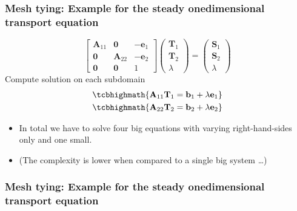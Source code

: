 \documentclass[10pt,xcolor=dvipsnames]{beamer}
\begin{document}
\begin{frame}[t]

 \frametitle{Mesh tying: Example for the steady onedimensional transport equation}
\begin{equation*}
 \begin{bmatrix}
   \mathbf A_{11} & \mathbf0 & -\mathbf e_1\\
   \mathbf0 & \mathbf A_{22} & -\mathbf e_2\\
   \mathbf 0 & \mathbf 0 & 1
  \end{bmatrix}
  \begin{pmatrix}
  \mathbf T_1\\ \mathbf T_2\\ \lambda
  \end{pmatrix} = \begin{pmatrix}\mathbf S_1 \\ \mathbf S_2 \\ \lambda \end{pmatrix}
\end{equation*}
\justifying Compute solution on each subdomain
\begin{equation*}
 \begin{split}
    \tcbhighmath{
    \mathbf A_{11} \mathbf T_1 = \mathbf b_1 + \lambda \mathbf e_1}\\
    \tcbhighmath{
    \mathbf A_{22} \mathbf T_2 = \mathbf b_2 + \lambda \mathbf e_2}
 \end{split}
\end{equation*}

\begin{itemize}
 \item In total we have to solve four big equations with varying right-hand-sides only and one small.
 \item (The complexity is lower when compared to a single big system \ldots)
\end{itemize}

 \end{frame}

\begin{frame}[t]

\frametitle{Mesh tying: Example for the steady onedimensional transport equation}
\vfill
{}\vfill
\end{frame}
\end{document}
